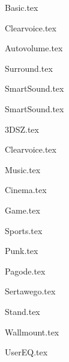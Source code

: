 {Basic.tex}

{Clearvoice.tex}

{Autovolume.tex}

{Surround.tex}

{SmartSound.tex}

{SmartSound.tex}

{3DSZ.tex}

{Clearvoice.tex}

{Music.tex}

{Cinema.tex}

{Game.tex}

{Sports.tex}

{Punk.tex}

{Pagode.tex}

{Sertawego.tex}

{Stand.tex}

{Wallmount.tex}

{UserEQ.tex}